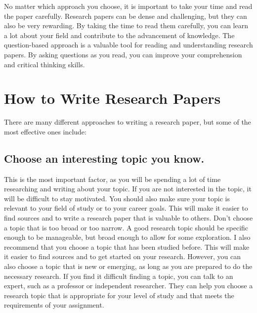 \documentclass[
  b5paper]{book}
\begin{document}
No matter which approach you choose, it is important to take your time and read the paper carefully. Research papers can be dense and challenging, but they can also be very rewarding. By taking the time to read them carefully, you can learn a lot about your field and contribute to the advancement of knowledge. The question-based approach is a valuable tool for reading and understanding research papers. By asking questions as you read, you can improve your comprehension and critical thinking skills.

\hypertarget{write}{%
\section{How to Write Research Papers}\label{write}}

There are many different approaches to writing a research paper, but some of the most effective ones include:

\hypertarget{choose-an-interesting-topic-you-know.}{%
\subsection*{Choose an interesting topic you know.}\label{choose-an-interesting-topic-you-know.}}

This is the most important factor, as you will be spending a lot of time researching and writing about your topic. If you are not interested in the topic, it will be difficult to stay motivated. You should also make sure your topic is relevant to your field of study or to your career goals. This will make it easier to find sources and to write a research paper that is valuable to others. Don't choose a topic that is too broad or too narrow. A good research topic should be specific enough to be manageable, but broad enough to allow for some exploration. I also recommend that you choose a topic that has been studied before. This will make it easier to find sources and to get started on your research. However, you can also choose a topic that is new or emerging, as long as you are prepared to do the necessary research. If you find it difficult finding a topic, you can talk to an expert, such as a professor or independent researcher. They can help you choose a research topic that is appropriate for your level of study and that meets the requirements of your assignment.
\end{document}
